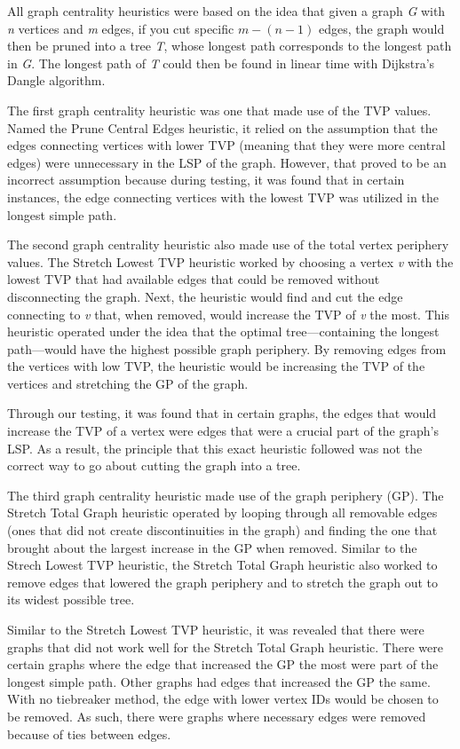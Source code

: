 \documentclass[twocolumn,showpacs,%
  nofootinbib,aps,superscriptaddress,%
  eqsecnum,prd,notitlepage,showkeys,11pt]{article}
\begin{document}
All graph centrality heuristics were based on the idea that given a graph \textit{G} with \textit{n} vertices and \textit{m} edges, if you cut specific \(m - (n - 1)\) edges, the graph would then be pruned into a tree \textit{T}, whose longest path corresponds to the longest path in \textit{G}. The longest path of \textit{T} could then be found in linear time with Dijkstra's Dangle algorithm.

The first graph centrality heuristic was one that made use of the TVP values. Named the Prune Central Edges heuristic, it relied on the assumption that the edges connecting vertices with lower TVP (meaning that they were more central edges) were unnecessary in the LSP of the graph. However, that proved to be an incorrect assumption because during testing, it was found that in certain instances, the edge connecting vertices with the lowest TVP was utilized in the longest simple path.

The second graph centrality heuristic also made use of the total vertex periphery values. The Stretch Lowest TVP heuristic worked by choosing a vertex \textit{v} with the lowest TVP that had available edges that could be removed without disconnecting the graph. Next, the heuristic would find and cut the edge connecting to \textit{v} that, when removed, would increase the TVP of \textit{v} the most. This heuristic operated under the idea that the optimal tree---containing the longest path---would have the highest possible graph periphery. By removing edges from the vertices with low TVP, the heuristic would be increasing the TVP of the vertices and stretching the GP of the graph.

Through our testing, it was found that in certain graphs, the edges that would increase the TVP of a vertex were edges that were a crucial part of the graph's LSP. As a result, the principle that this exact heuristic followed was not the correct way to go about cutting the graph into a tree.

The third graph centrality heuristic made use of the graph periphery (GP). The Stretch Total Graph heuristic operated by looping through all removable edges (ones that did not create discontinuities in the graph) and finding the one that brought about the largest increase in the GP when removed. Similar to the Strech Lowest TVP heuristic, the Stretch Total Graph heuristic also worked to remove edges that lowered the graph periphery and to stretch the graph out to its widest possible tree. 

Similar to the Stretch Lowest TVP heuristic, it was revealed that there were graphs that did not work well for the Stretch Total Graph heuristic. There were certain graphs where the edge that increased the GP the most were part of the longest simple path. Other graphs had edges that increased the GP the same. With no tiebreaker method, the edge with lower vertex IDs would be chosen to be removed. As such, there were graphs where necessary edges were removed because of ties between edges.
\end{document}
